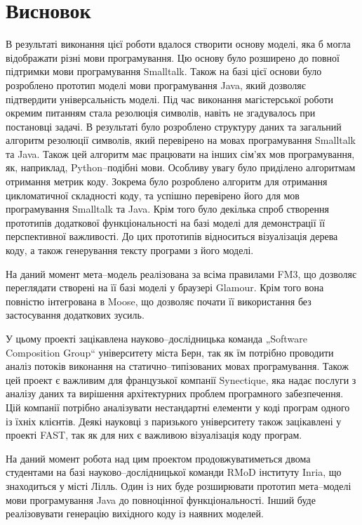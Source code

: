 \documentclass[12pt,a4paper]{article}
\begin{document}
\clearpage


\section{Висновок}
В результаті виконання цієї роботи вдалося створити основу моделі, яка б могла відображати різні мови програмування. Цю основу було розширено до повної підтримки мови програмування Smalltalk. Також на базі цієї основи було розроблено прототип моделі мови програмування Java, який дозволяє підтвердити універсальність моделі. Під час виконання магістерської роботи окремим питанням стала резолюція символів, навіть не згадувалось при постановці задачі. В результаті було розроблено структуру даних та загальний алгоритм резолюції символів, який перевірено на мовах програмування Smalltalk та Java. Також цей алгоритм має працювати на інших сім'ях мов програмування, як, наприклад, Python--подібні мови. Особливу увагу було приділено алгоритмам отримання метрик коду. Зокрема було розроблено алгоритм для отримання цикломатичної складності коду, та успішно перевірено його для мов програмування Smalltalk та Java. Крім того було декілька спроб створення прототипів додаткової функціональності на базі моделі для демонстрації її перспективної важливості. До цих прототипів відноситься візуалізація дерева коду, а також генерування тексту програми з його моделі.

На даний момент мета--модель реалізована за всіма правилами FM3, що дозволяє переглядати створені на її базі моделі у браузері Glamour. Крім того вона повністю інтегрована в Moose, що дозволяє почати її використання без застосування додаткових зусиль.

У цьому проекті зацікавлена науково--дослідницька команда „Software Composition Group“ університету міста Берн, так як їм потрібно проводити аналіз потоків виконання на статично--типізованих мовах програмування. Також цей проект є важливим для французької компанії Synectique, яка надає послуги з аналізу даних та вирішення архітектурних проблем програмного забезпечення. Цій компанії потрібно аналізувати нестандартні елементи у коді програм одного із їхніх клієнтів. Деякі науковці з паризького університету також зацікавлені у проекті FAST, так як для них є важливою візуалізація коду програм.

На даний момент робота над цим проектом продовжуватиметься двома студентами на базі науково--дослідницької команди RMoD інституту Inria, що знаходиться у місті Лілль. Один із них буде розширювати прототип мета--моделі мови програмування Java до повноцінної функціональності. Інший буде реалізовувати генерацію вихідного коду із наявних моделей.
\end{document}
